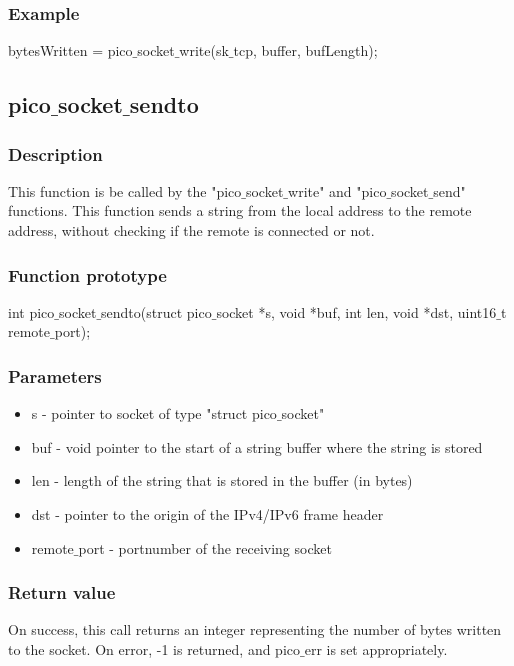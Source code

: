 \subsubsection*{Example}
bytesWritten = pico$\_$socket$\_$write(sk$\_$tcp, buffer, bufLength);


\subsection{pico$\_$socket$\_$sendto}

\subsubsection*{Description}
This function is be called by the "pico$\_$socket$\_$write" and "pico$\_$socket$\_$send" functions.
This function sends a string from the local address to the remote address, without checking
if the remote is connected or not.

\subsubsection*{Function prototype}
int pico$\_$socket$\_$sendto(struct pico$\_$socket *s, void *buf, int len, void *dst, uint16$\_$t remote$\_$port);

\subsubsection*{Parameters}
\begin{itemize}
\item s - pointer to socket of type "struct pico$\_$socket"
\item buf - void pointer to the start of a string buffer where the string is stored
\item len - length of the string that is stored in the buffer (in bytes)
\item dst - pointer to the origin of the IPv4/IPv6 frame header
\item remote$\_$port - portnumber of the receiving socket
\end{itemize}

\subsubsection*{Return value}
On success, this call returns an integer representing the number of bytes written to the socket.
On error, -1 is returned, and pico$\_$err is set appropriately.

